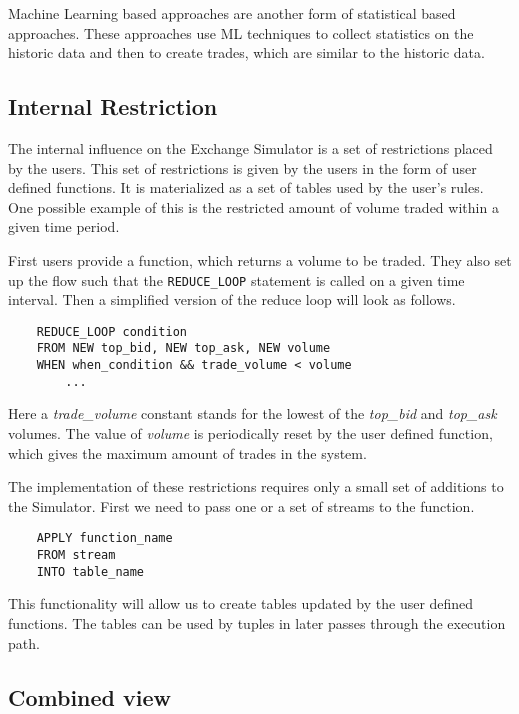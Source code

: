 \documentclass{article}
\begin{document}
Machine Learning based approaches are another form of statistical based approaches. These approaches use ML techniques to collect statistics on the historic data and then to create trades, which are similar to the historic data. 

\subsection{Internal Restriction}

The internal influence on the Exchange Simulator is a set of restrictions placed by the users. This set of restrictions is given by the users in the form of user defined functions. It is materialized as a set of tables used by the user's rules. One possible example of this is the restricted amount of volume traded within a given time period.  

First users provide a function, which returns a volume to be traded. They also set up the flow such that the {\tt REDUCE\_LOOP} statement is called on a given time interval. Then a simplified version of the reduce loop will look as follows.

\begin{verbatim}
    REDUCE_LOOP condition
    FROM NEW top_bid, NEW top_ask, NEW volume
    WHEN when_condition && trade_volume < volume
        ...
\end{verbatim}

Here a \emph{trade\_volume} constant stands for the lowest of the \emph{top\_bid} and \emph{top\_ask} volumes. The value of \emph{volume} is periodically reset by the user defined function, which gives the maximum amount of trades in the system.

The implementation of these restrictions requires only a small set of additions to the Simulator. First we need to pass one or a set of streams to the function. 

\begin{verbatim}
    APPLY function_name
    FROM stream
    INTO table_name
\end{verbatim}

\noindent This functionality will allow us to create tables updated by the user defined functions. The tables can be used by tuples in later passes through the execution path.

\subsection{Combined view} 
\end{document}
